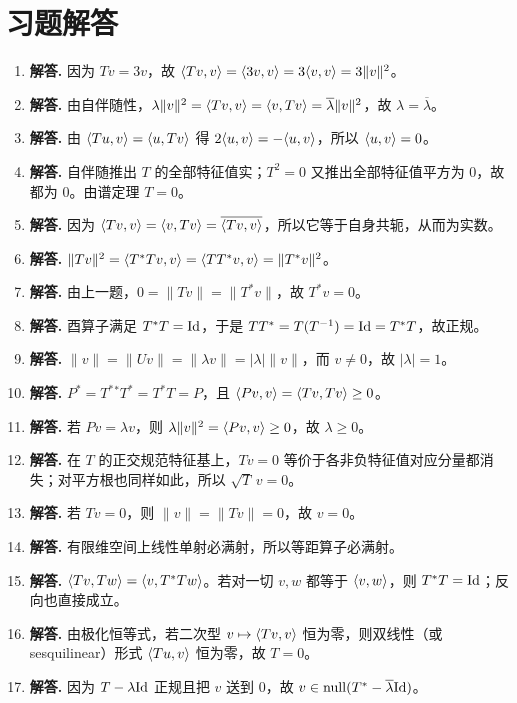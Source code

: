 \section*{习题解答}
\begin{enumerate}[label=\textbf{\arabic*.}, leftmargin=*, itemsep=1em]
\item \textbf{解答.} 因为 $Tv=3v$，故 $\langle Tv, v \rangle=\langle 3v, v \rangle=3\langle v, v \rangle=3\|v\|^2$。
\item \textbf{解答.} 由自伴随性，$\lambda\|v\|^2=\langle Tv, v \rangle=\langle v, Tv \rangle=\overline{\lambda}\|v\|^2$，故 $\lambda=\overline{\lambda}$。
\item \textbf{解答.} 由 $\langle Tu, v \rangle=\langle u, Tv \rangle$ 得 $2\langle u, v \rangle=-\langle u, v \rangle$，所以 $\langle u, v \rangle=0$。
\item \textbf{解答.} 自伴随推出 $T$ 的全部特征值实；$T^2=0$ 又推出全部特征值平方为 $0$，故都为 $0$。由谱定理 $T=0$。
\item \textbf{解答.} 因为 $\langle Tv, v \rangle=\langle v, Tv \rangle=\overline{\langle Tv, v \rangle}$，所以它等于自身共轭，从而为实数。
\item \textbf{解答.} $\|Tv\|^2=\langle T^*Tv, v \rangle=\langle TT^*v, v \rangle=\|T^*v\|^2$。
\item \textbf{解答.} 由上一题，$0=\|Tv\|=\|T^*v\|$，故 $T^*v=0$。
\item \textbf{解答.} 酉算子满足 $T^*T=\mathrm{Id}$，于是 $TT^*=T(T^{-1})=\mathrm{Id}=T^*T$，故正规。
\item \textbf{解答.} $\|v\|=\|Uv\|=\|\lambda v\|=|\lambda|\|v\|$，而 $v\neq0$，故 $|\lambda|=1$。
\item \textbf{解答.} $P^*=T^*{}^*T^*=T^*T=P$，且 $\langle Pv, v \rangle=\langle Tv, Tv \rangle\ge0$。
\item \textbf{解答.} 若 $Pv=\lambda v$，则 $\lambda\|v\|^2=\langle Pv, v \rangle\ge0$，故 $\lambda\ge0$。
\item \textbf{解答.} 在 $T$ 的正交规范特征基上，$Tv=0$ 等价于各非负特征值对应分量都消失；对平方根也同样如此，所以 $\sqrt{T}\,v=0$。
\item \textbf{解答.} 若 $Tv=0$，则 $\|v\|=\|Tv\|=0$，故 $v=0$。
\item \textbf{解答.} 有限维空间上线性单射必满射，所以等距算子必满射。
\item \textbf{解答.} $\langle Tv, Tw \rangle=\langle v, T^*Tw \rangle$。若对一切 $v,w$ 都等于 $\langle v, w \rangle$，则 $T^*T=\mathrm{Id}$；反向也直接成立。
\item \textbf{解答.} 由极化恒等式，若二次型 $v\mapsto\langle Tv, v \rangle$ 恒为零，则双线性（或 sesquilinear）形式 $\langle Tu, v \rangle$ 恒为零，故 $T=0$。
\item \textbf{解答.} 因为 $T-\lambda\mathrm{Id}$ 正规且把 $v$ 送到 $0$，故 $v\in\mathrm{null}(T^*-\overline{\lambda}\mathrm{Id})$。

\end{enumerate}
